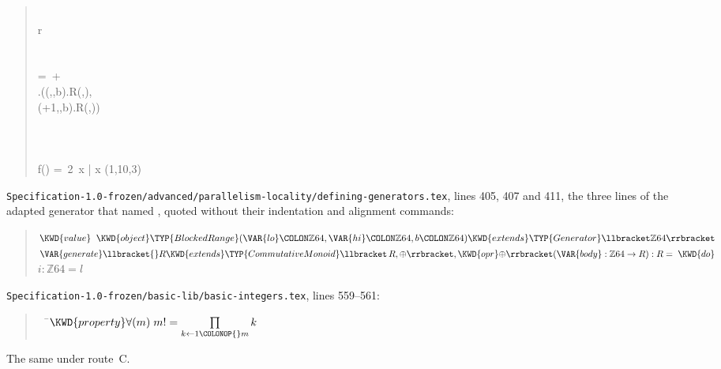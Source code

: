 \begin{description}
\begin{quote}
\begin{FortressCode}
       \\
      r\- \\
     \\
    \2\+ \\
       = \left\lfloor\,{\textstyle{}+\over{}}\,\right\rfloor \\
      .(\+(,,b).\llbracket{}R\rrbracket(,), \\
                     (+1,,b).\llbracket{}R\rrbracket(,))\-\- \\
    \-\- \\
 \\
 \\
f(\ultrathin) = \bigl\langle\,2\, x \bigm| x \leftarrow {}(1,10,3)\,\bigr\rangle
\end{FortressCode}
\end{quote}
\nolinkurl{Specification-1.0-frozen/advanced/parallelism-locality/defining-generators.tex},
lines 405, 407 and 411, the three lines of the adapted generator that named
, quoted without their indentation and alignment commands:
\begin{quote}
\begin{Fortress}
\( \KWD{value}\;\;\KWD{object} \TYP{BlockedRange}(\VAR{lo}\COLON \mathbb{Z}64, \VAR{hi}\COLON \mathbb{Z}64, b\COLON \mathbb{Z}64) \KWD{extends} \TYP{Generator}\llbracket\mathbb{Z}64\rrbracket\)\\
\(   \VAR{generate}\llbracket{}R \KWD{extends} \TYP{CommutativeMonoid}\llbracket\,R, \oplus\rrbracket, \KWD{opr} \mathord{\oplus}\rrbracket(\VAR{body} \mathrel{\mathtt{:}} \mathbb{Z}64 \rightarrow R) \mathrel{\mathtt{:}} R = \;\KWD{do}\)\\
\(         i \mathrel{\mathtt{:}} \mathbb{Z}64 = l\)\\
\end{Fortress}
\end{quote}
\nolinkurl{Specification-1.0-frozen/basic-lib/basic-integers.tex}, lines 559--561:
\begin{quote}
\begin{Fortress}
{\tt~~}\pushtabs\=\+\(  \KWD{property} \forall (m)\; m! = \prod\limits_{k\leftarrow{}1\COLONOP{}m} k\)\-\\\poptabs
\end{Fortress}
\end{quote}
\item[Route C] The same under route~C.
\end{description}

